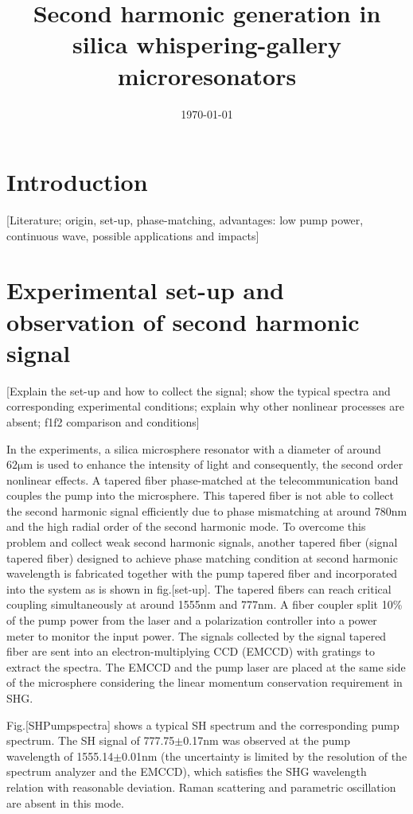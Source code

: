 \documentclass[a4paper,12pt,hyperref]{article}
\title{\bfseries \Large Second harmonic generation in silica whispering-gallery microresonators}
\date{\normalsize \today}
\begin{document}
\maketitle

\section{Introduction}

[Literature; origin, set-up, phase-matching, advantages: low pump power, continuous wave, possible applications and impacts]


\section{Experimental set-up and observation of second harmonic signal}
[Explain the set-up and how to collect the signal; show the typical spectra and corresponding experimental conditions; explain why other nonlinear processes are absent; f1f2 comparison and conditions]

In the experiments, a silica microsphere resonator with a diameter of around $62\mathrm{\mu m}$ is used to enhance the intensity of light and  consequently, the second order nonlinear effects. A tapered fiber phase-matched at the telecommunication band couples the pump into the microsphere\cite{knight1997phase, cai2000observation}. This tapered fiber is not able to collect the second harmonic signal efficiently due to phase mismatching at around 780nm and the high radial order of the second harmonic mode\cite{carmon2007visible}. To overcome this problem and collect weak second harmonic signals, another tapered fiber (signal tapered fiber) designed to achieve phase matching condition at second harmonic wavelength is fabricated together with the pump tapered fiber and incorporated into the system as is shown in fig.[set-up]. The tapered fibers can reach critical coupling simultaneously at around 1555nm and 777nm. A fiber coupler split 10\% of the pump power from the laser and a polarization controller into a power meter to monitor the input power. The signals collected by the signal tapered fiber are sent into an electron-multiplying CCD (EMCCD) with gratings to extract the spectra. The EMCCD and the pump laser are placed at the same side of the microsphere considering the linear momentum conservation requirement in SHG\cite{carmon2007visible, kozyreff2008whispering}.

Fig.[SHPumpspectra] shows a typical SH spectrum and the corresponding pump spectrum. The SH signal of 777.75$\pm$0.17nm was observed at the pump wavelength of 1555.14$\pm$0.01nm (the uncertainty is limited by the resolution of the spectrum analyzer and the EMCCD), which satisfies the SHG wavelength relation with reasonable deviation. Raman scattering and parametric oscillation are absent in this mode. 
\end{document}
